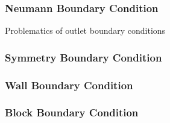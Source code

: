       \subsubsection{Neumann Boundary Condition}

        Problematics of outlet boundary conditions

      \subsubsection{Symmetry Boundary Condition}

      \subsubsection{Wall Boundary Condition}

      \subsubsection{Block Boundary Condition}
      

